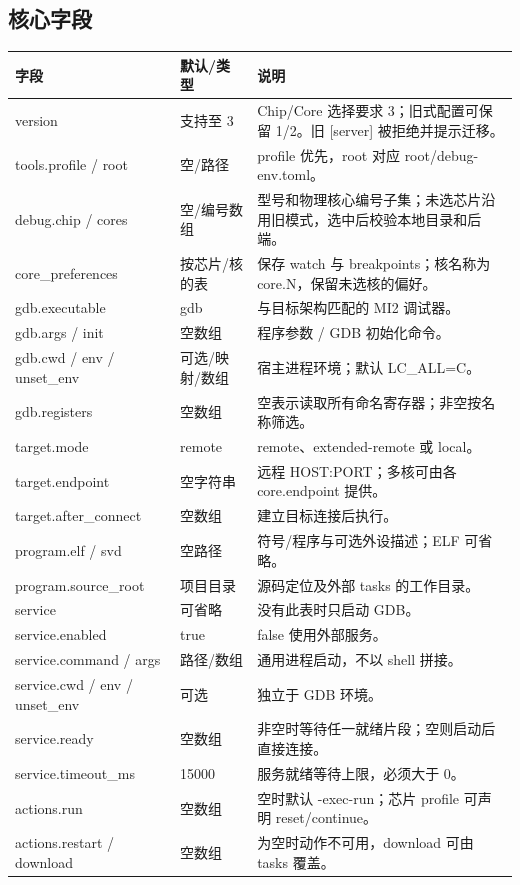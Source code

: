 \documentclass[UTF8,a4paper,11pt,oneside,fontset=none]{ctexart}
\begin{document}
\subsection{核心字段}
\begin{longtable}{@{}P{42mm}P{32mm}P{87mm}@{}}\toprule
字段 & 默认/类型 & 说明\\\midrule\endhead
version & 支持至 3 & Chip/Core 选择要求 3；旧式配置可保留 1/2。旧 [server] 被拒绝并提示迁移。\\
tools.profile / root & 空/路径 & profile 优先，root 对应 root/debug-env.toml。\\
debug.chip / cores & 空/编号数组 & 型号和物理核心编号子集；未选芯片沿用旧模式，选中后校验本地目录和后端。\\
core\_preferences & 按芯片/核的表 & 保存 watch 与 breakpoints；核名称为 core.N，保留未选核的偏好。\\
gdb.executable & gdb & 与目标架构匹配的 MI2 调试器。\\
gdb.args / init & 空数组 & 程序参数 / GDB 初始化命令。\\
gdb.cwd / env / unset\_env & 可选/映射/数组 & 宿主进程环境；默认 LC\_ALL=C。\\
gdb.registers & 空数组 & 空表示读取所有命名寄存器；非空按名称筛选。\\
target.mode & remote & remote、extended-remote 或 local。\\
target.endpoint & 空字符串 & 远程 HOST:PORT；多核可由各 core.endpoint 提供。\\
target.after\_connect & 空数组 & 建立目标连接后执行。\\
program.elf / svd & 空路径 & 符号/程序与可选外设描述；ELF 可省略。\\
program.source\_root & 项目目录 & 源码定位及外部 tasks 的工作目录。\\
service & 可省略 & 没有此表时只启动 GDB。\\
service.enabled & true & false 使用外部服务。\\
service.command / args & 路径/数组 & 通用进程启动，不以 shell 拼接。\\
service.cwd / env / unset\_env & 可选 & 独立于 GDB 环境。\\
service.ready & 空数组 & 非空时等待任一就绪片段；空则启动后直接连接。\\
service.timeout\_ms & 15000 & 服务就绪等待上限，必须大于 0。\\
actions.run & 空数组 & 空时默认 -exec-run；芯片 profile 可声明 reset/continue。\\
actions.restart / download & 空数组 & 为空时动作不可用，download 可由 tasks 覆盖。\\

\end{longtable}
\end{document}
